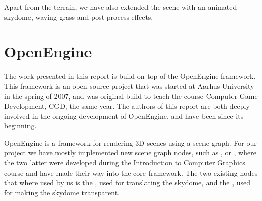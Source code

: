 Apart from the terrain, we have also extended the scene with an
animated skydome, waving grass and post process effects.



\section{OpenEngine}
The work presented in this report is build on top of the OpenEngine
framework. This framework is an open source project that was started
at Aarhus University in the spring of 2007, and was original build to
teach the course Computer Game Development, CGD, the same year. The
authors of this report are both deeply involved in the ongoing
development of OpenEngine, and have been since its beginning.

OpenEngine is a framework for rendering 3D scenes using a scene graph.
For our project we have mostly implemented new scene graph nodes, such
as ,  or ,
where the two latter were developed during the Introduction to
Computer Graphics course and have made their way into the core
framework. The two existing nodes that where used by us is the
, used for translating the skydome, and the
, used for making the skydome transparent.\\

